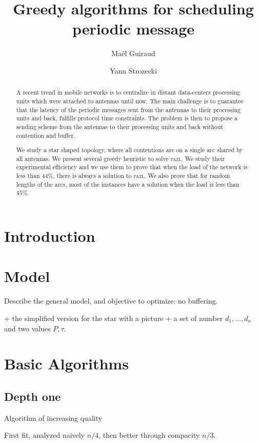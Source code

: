 \documentclass[10pt, conference, letterpaper]{IEEEtran}
\title{Greedy algorithms for scheduling periodic message }
\author[1,2]{Ma\"el Guiraud}
\author[1]{Yann Strozecki}
\affil[1]{David Laboratory, UVSQ}
\affil[2]{Nokia Bell Labs France}
\newcommand\pazl{\textsc{pazl}\xspace}
\begin{document}
\maketitle

\begin{abstract}

A recent trend in mobile networks is to centralize in distant data-centers  processing units which were attached to antennas until now. The main challenge is to guarantee that the latency of the periodic messages sent from the antennas to their processing units and back, fulfills protocol time constraints. The problem is then to propose a sending scheme from the antennas to their processing units and back without contention and buffer.

We study a star shaped topology, where all contentions are on a single arc shared by all antennas. We present several greedy heuristic to solve \pazl. We study their experimental efficiency and we use them to prove that when the load of the network is less than $44\%$, there is always a solution to \pazl. We also prove that for random lengths of the arcs, most of the instances have a solution when the load is less than $45\%$.  
\end{abstract}


\section{Introduction}


\section{Model}
Describe the general model, and objective to optimize: no buffering.

 + the simplified version for the star with a picture + a set of number $d_1,\dots,d_n$ and two values $P, \tau$. 
\cite{Guir1806:Deterministic}

\section{Basic Algorithms}

\subsection{Depth one}

Algorithm of increasing quality

First fit, analyzed naively $n/4$, then better through compacity $n/3$.
\end{document}
